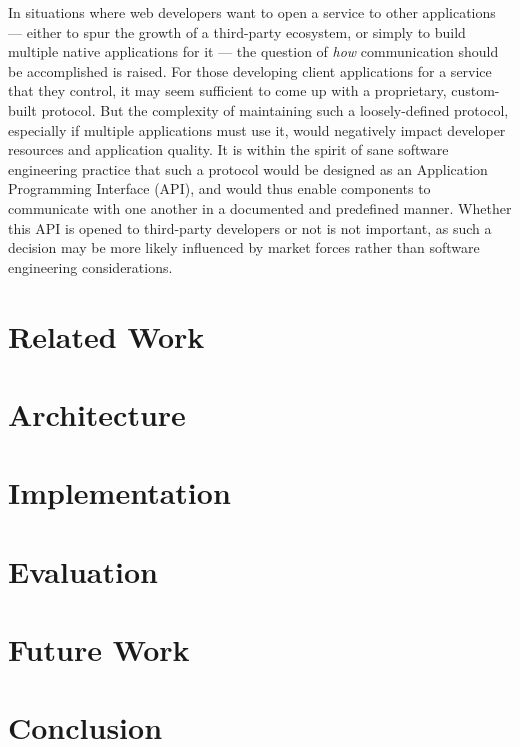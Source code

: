\documentclass[letterpaper,twocolumn,10pt,draft]{article}
\begin{document}
In situations where web developers want to open a service to other applications --- either to spur the growth of a third-party ecosystem, or simply to build multiple native applications for it --- the question of \emph{how} communication should be accomplished is raised. For those developing client applications for a service that they control, it may seem sufficient to come up with a proprietary, custom-built protocol. But the complexity of maintaining such a loosely-defined protocol, especially if multiple applications must use it, would negatively impact developer resources and application quality. It is within the spirit of sane software engineering practice that such a protocol would be designed as an Application Programming Interface (API), and would thus enable components to communicate with one another in a documented and predefined manner. Whether this API is opened to third-party developers or not is not important, as such a decision may be more likely influenced by market forces rather than software engineering considerations.


\section{\label{sec:relwork}Related Work}
\section{\label{sec:arch}Architecture}
\section{\label{sec:impl}Implementation}
\section{\label{sec:eval}Evaluation}
\section{\label{sec:fw}Future Work}
\section{\label{sec:con}Conclusion}
\end{document}
